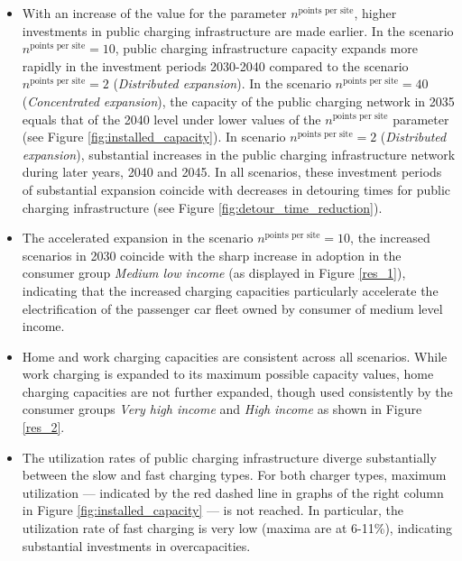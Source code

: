 \documentclass[preprint,review,11pt, authoryear]{elsarticle}
\begin{document}
        \begin{itemize}
            \item With an increase of the value for the parameter $n^{\textrm{points per site}}$, higher investments in public charging infrastructure are made earlier. In the scenario $n^{\textrm{points per site}} = 10$, public charging infrastructure capacity expands more rapidly in the investment periods 2030-2040 compared to the scenario $n^{\textrm{points per site}} = 2$ (\textit{Distributed expansion}). In the scenario $n^{\textrm{points per site}} = 40$ (\textit{Concentrated expansion}), the capacity of the public charging network in 2035 equals that of the 2040 level under lower values of the $n^{\textrm{points per site}}$ parameter (see Figure \ref{fig:installed_capacity}). In scenario $n^{\textrm{points per site}} = 2$ (\textit{Distributed expansion}), substantial increases in the public charging infrastructure network  during later years, 2040 and 2045. In all scenarios, these investment periods of substantial expansion coincide with decreases in detouring times for public charging infrastructure (see Figure \ref{fig:detour_time_reduction}). 
            \item The accelerated expansion in the scenario $n^{\textrm{points per site}} = 10$, the increased scenarios in 2030 coincide with the sharp increase in adoption in the consumer group \textit{Medium low income} (as displayed in Figure \ref{res_1}), indicating that the increased charging capacities particularly accelerate the electrification of the passenger car fleet owned by consumer of medium level income.
            \item Home and work charging capacities are consistent across all scenarios. While work charging is expanded to its maximum possible capacity values, home charging capacities are not further expanded, though used consistently by the consumer groups \textit{Very high income} and \textit{High income} as shown in Figure \ref{res_2}. 
            \item The utilization rates of public charging infrastructure diverge substantially between the slow and fast charging types. For both charger types, maximum utilization  --- indicated by the red dashed line in graphs of the right column in Figure \ref{fig:installed_capacity} --- is not reached. In particular, the utilization rate of fast charging is very low (maxima are at 6-11\%), indicating substantial investments in overcapacities.

\end{itemize}
\end{document}
